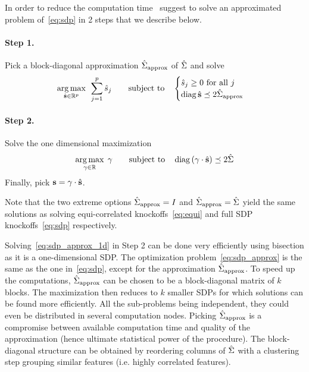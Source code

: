 In order to reduce the computation time~\cite{model_x_knockoffs}
suggest to solve an approximated problem of~\ref{eq:sdp} in 2 steps that we describe below.
\paragraph*{Step 1.}
Pick a block-diagonal approximation $\hat{\Sigma}_\text{approx}$ of $\hat{\Sigma}$ and solve
\begin{equation}\label{eq:sdp_approx}
    \underset{\hat{\mathbf{s}} \in \mathbb{R}^p}{\operatorname*{arg\,max}}\;\,
    \sum_{j = 1}^p \hat{s}_j
    \qquad
    \text{subject to}\quad \begin{cases}
        \hat{s}_j \geq 0\text{ for all } j\\
        \operatorname*{diag} \hat{\mathbf{s}} \preceq 2\hat{\Sigma}_\text{approx}
    \end{cases}
\end{equation}
\paragraph*{Step 2.}
Solve the one dimensional maximization
\begin{equation}\label{eq:sdp_approx_1d}
    \underset{\gamma \in \mathbb{R}}{\operatorname*{arg\,max}}\;\,\gamma
    \qquad\text{subject to}\quad
    \operatorname*{diag}\left( \gamma \cdot \hat{\mathbf{s}} \right) \preceq 2\hat{\Sigma}
\end{equation}
Finally, pick $\mathbf{s} = \gamma \cdot \hat{\mathbf{s}}$.
\begin{remark}
    Note that the two extreme options $\hat{\Sigma}_\text{approx} = I$ and $\hat{\Sigma}_\text{approx} = \hat{\Sigma}$ yield
    the same solutions as solving equi-correlated knockoffs~\ref{eq:equi} and full SDP knockoffs~\ref{eq:sdp} respectively.
\end{remark}
Solving~\ref{eq:sdp_approx_1d} in Step 2 can be done very efficiently using bisection as it is a one-dimensional SDP\@.
The optimization problem~\ref{eq:sdp_approx} is the same as the one in~\ref{eq:sdp},
except for the approximation $\hat{\Sigma}_\text{approx}$.
To speed up the computations,
$\hat{\Sigma}_\text{approx}$ can be chosen to be a block-diagonal matrix of $k$ blocks.
The maximization then reduces to $k$ smaller SDPs for which solutions can be found more efficiently.
All the sub-problems being independent, they could even be distributed in several computation nodes.
Picking $\hat{\Sigma}_\text{approx}$ is a compromise between available computation time and quality of the approximation
(hence ultimate statistical power of the procedure).
The block-diagonal structure can be obtained by reordering columns of $\hat{\Sigma}$
with a clustering step grouping similar features (i.e. highly correlated features).

